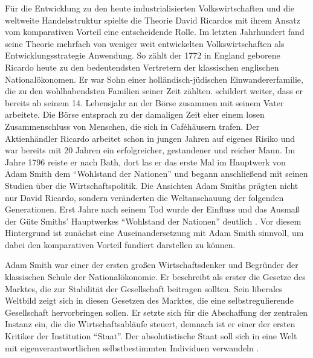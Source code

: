 Für die Entwicklung zu den heute industrialisierten Volkswirtschaften und die weltweite Handelsstruktur spielte die Theorie David Ricardos mit ihrem Ansatz vom komparativen Vorteil eine entscheidende Rolle. Im letzten Jahrhundert fand seine Theorie mehrfach von weniger weit entwickelten Volkswirtschaften als Entwicklungsstrategie Anwendung. So zählt  der 1772 in England geborene Ricardo heute zu den bedeutendsten Vertretern der klassischen englischen National{\"o}konomen. Er war Sohn einer holl{\"a}ndisch-j{\"u}dischen Einwandererfamilie, die zu den wohlhabendsten Familien seiner Zeit z{\"a}hlten. \citet{Lin.2007} schildert weiter, dass er bereits ab seinem 14. Lebensjahr an der B{\"o}rse zusammen mit seinem Vater arbeitete. Die B{\"o}rse entsprach zu der damaligen Zeit eher einem losen Zusammenschluss von Menschen, die sich in Caf{\'e}h{\"a}usern trafen. Der Aktienh{\"a}ndler Ricardo arbeitet schon in jungen Jahren auf eigenes Risiko und war bereits mit 20 Jahren ein erfolgreicher, gestandener und reicher Mann. \newline Im Jahre 1796 reiste er nach Bath, dort las er das erste Mal im Hauptwerk von Adam Smith dem "`Wohlstand der Nationen"' und begann anschlie{\ss}end mit seinen Studien {\"u}ber die Wirtschaftspolitik. Die Ansichten Adam Smiths p\textsl{}r{\"a}gten nicht nur David Ricardo, sondern ver{\"a}nderten die Weltanschauung der folgenden Generationen. Erst Jahre nach seinem Tod wurde der Einfluss und das Ausma{\ss} der G{\"u}te Smiths' Hauptwerkes "`Wohlstand der Nationen"' deutlich \citep{Lin.2007}. Vor diesem Hintergrund ist zunächst eine Auseinandersetzung mit Adam Smith sinnvoll, um dabei den komparativen Vorteil fundiert darstellen zu können.\newline


Adam Smith war einer der ersten gro{\ss}en Wirtschaftsdenker und Begr{\"u}nder der klassischen Schule der National{\"o}konomie. Er beschreibt als erster die Gesetze des Marktes, die zur Stabilit{\"a}t der Gesellschaft beitragen sollten.  Sein liberales Weltbild zeigt sich in diesen Gesetzen des Marktes, die eine selbstregulierende Gesellschaft hervorbringen sollen. Er setzte sich f{\"u}r die Abschaffung der zentralen Instanz ein, die die Wirtschaftsabl{\"a}ufe steuert, demnach ist er einer der ersten Kritiker der Institution "`Staat"'. Der absolutistische Staat soll sich in eine Welt mit eigenverantwortlichen selbstbestimmten Individuen verwandeln \citep{Lin.2007,Huther.2006}.\\


